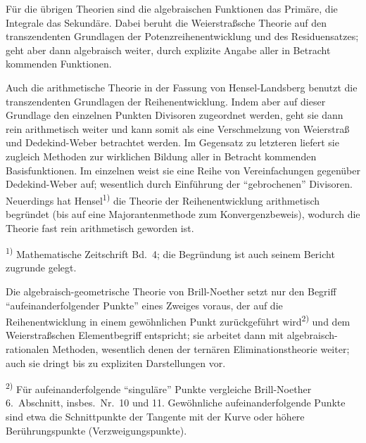 \documentclass[12pt,a4paper]{article}
\begin{document}
F\"ur die \"ubrigen Theorien sind die algebraischen Funktionen das Prim\"are, die Integrale das Sekund\"are. Dabei beruht die Weierstra\ss{}sche Theorie auf den transzendenten Grundlagen der Potenzreihenentwicklung und des Residuensatzes; geht aber dann algebraisch weiter, durch explizite Angabe aller in Betracht kommenden Funktionen.

Auch die arithmetische Theorie in der Fassung von Hensel-Landsberg benutzt die transzendenten Grundlagen der Reihenentwicklung. Indem aber auf dieser Grundlage den einzelnen Punkten Divisoren zugeordnet werden, geht sie dann rein arithmetisch weiter und kann somit als eine Verschmelzung von Weierstra\ss{} und Dedekind-Weber betrachtet werden. Im Gegensatz zu letzteren liefert sie zugleich Methoden zur wirklichen Bildung aller in Betracht kommenden Basisfunktionen. Im einzelnen weist sie eine Reihe von Vereinfachungen gegen\"uber Dedekind-Weber auf; wesentlich durch Einf\"uhrung der ``gebrochenen'' Divisoren. Neuerdings hat Hensel\textsuperscript{1)} die Theorie der Reihenentwicklung arithmetisch begr\"undet (bis auf eine Majorantenmethode zum Konvergenzbeweis), wodurch die Theorie fast rein arithmetisch geworden ist.

\smallskip
\noindent\textsuperscript{1)} Mathematische Zeitschrift Bd.\ 4; die Begr\"undung ist auch seinem Bericht zugrunde gelegt.

Die algebraisch-geometrische Theorie von Brill-Noether setzt nur den Begriff ``aufeinanderfolgender Punkte'' eines Zweiges voraus, der auf die Reihenentwicklung in einem gew\"ohnlichen Punkt zur\"uckgef\"uhrt wird\textsuperscript{2)} und dem Weierstra\ss{}schen Elementbegriff entspricht; sie arbeitet dann mit algebraisch-rationalen Methoden, wesentlich denen der tern\"aren Eliminationstheorie weiter; auch sie dringt bis zu expliziten Darstellungen vor.

\smallskip
\noindent\textsuperscript{2)} F\"ur aufeinanderfolgende ``singul\"are'' Punkte vergleiche Brill-Noether 6.\ Abschnitt, insbes.\ Nr.\ 10 und 11. Gew\"ohnliche aufeinanderfolgende Punkte sind etwa die Schnittpunkte der Tangente mit der Kurve oder h\"ohere Ber\"uhrungspunkte (Verzweigungspunkte).
\end{document}
